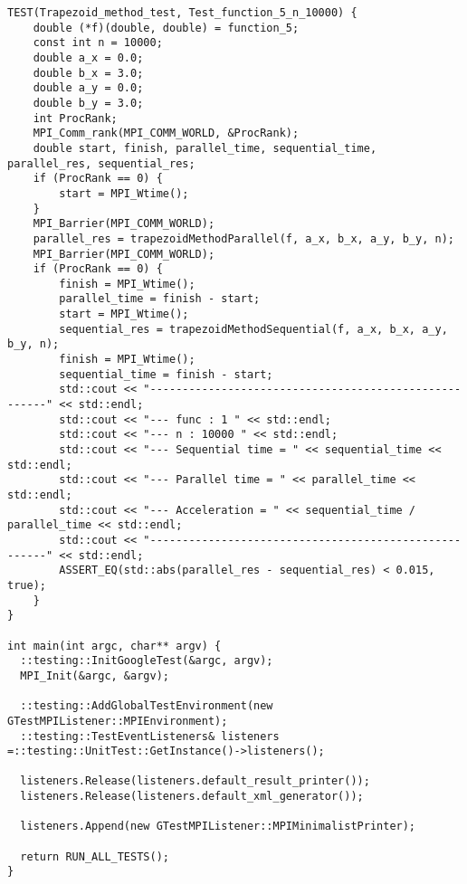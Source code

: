 \documentclass{report}
\begin{document}
\begin{lstlisting}
TEST(Trapezoid_method_test, Test_function_5_n_10000) {
    double (*f)(double, double) = function_5;
    const int n = 10000;
    double a_x = 0.0;
    double b_x = 3.0;
    double a_y = 0.0;
    double b_y = 3.0;
    int ProcRank;
    MPI_Comm_rank(MPI_COMM_WORLD, &ProcRank);
    double start, finish, parallel_time, sequential_time, parallel_res, sequential_res;
    if (ProcRank == 0) {
        start = MPI_Wtime();
    }
    MPI_Barrier(MPI_COMM_WORLD);
    parallel_res = trapezoidMethodParallel(f, a_x, b_x, a_y, b_y, n);
    MPI_Barrier(MPI_COMM_WORLD);
    if (ProcRank == 0) {
        finish = MPI_Wtime();
        parallel_time = finish - start;
        start = MPI_Wtime();
        sequential_res = trapezoidMethodSequential(f, a_x, b_x, a_y, b_y, n);
        finish = MPI_Wtime();
        sequential_time = finish - start;
        std::cout << "------------------------------------------------------" << std::endl;
        std::cout << "--- func : 1 " << std::endl;
        std::cout << "--- n : 10000 " << std::endl;
        std::cout << "--- Sequential time = " << sequential_time << std::endl;
        std::cout << "--- Parallel time = " << parallel_time << std::endl;
        std::cout << "--- Acceleration = " << sequential_time / parallel_time << std::endl;
        std::cout << "------------------------------------------------------" << std::endl;
        ASSERT_EQ(std::abs(parallel_res - sequential_res) < 0.015, true);
    }
}

int main(int argc, char** argv) {
  ::testing::InitGoogleTest(&argc, argv);
  MPI_Init(&argc, &argv);

  ::testing::AddGlobalTestEnvironment(new GTestMPIListener::MPIEnvironment);
  ::testing::TestEventListeners& listeners =::testing::UnitTest::GetInstance()->listeners();

  listeners.Release(listeners.default_result_printer());
  listeners.Release(listeners.default_xml_generator());

  listeners.Append(new GTestMPIListener::MPIMinimalistPrinter);

  return RUN_ALL_TESTS();
}
\end{lstlisting}
\end{document}
